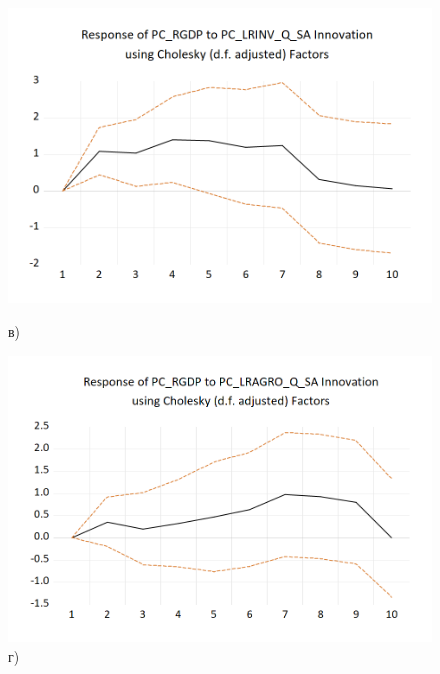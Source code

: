 \documentclass[a4paper, 14pt]{extreport}
\numberwithin{equation}{section}
\numberwithin{equation}{section}
\begin{document}
\begin{figure}[h!]
		\begin{minipage}{0.5\textwidth}
			\centering
			\includegraphics[scale=0.4]{images/image37}
			\caption*{в)}
		\end{minipage}%
		\hfill %
		\begin{minipage}{0.5\textwidth}
			\centering
			\includegraphics[scale=0.4]{images/image38}
			\caption*{г)}
		\end{minipage}%
		

\end{figure}
\end{document}
